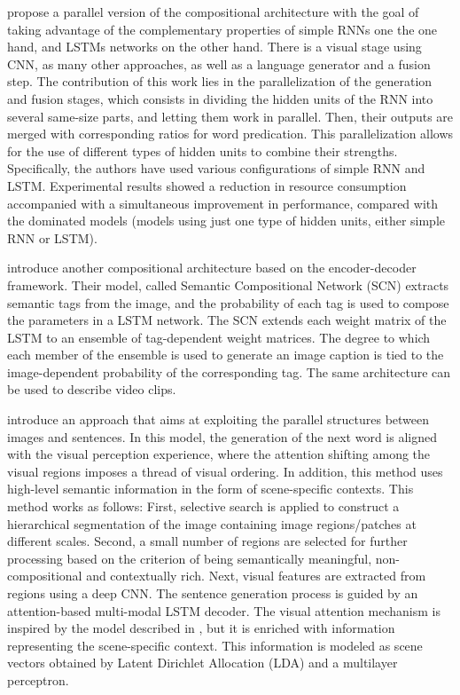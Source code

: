 \citet{Wang2016_Parallel} propose a parallel version of the compositional architecture with the goal of taking advantage of the complementary properties of simple RNNs one the one hand, and LSTMs networks on the other hand. There is a visual stage using CNN, as many other approaches, as well as a language generator and a fusion step. The contribution of this work lies in the parallelization of the generation and fusion stages, which consists in dividing the hidden units of the RNN into several same-size parts, and letting them work in parallel. Then, their outputs are merged with corresponding ratios for word predication. This parallelization allows for the use of different types of hidden units to combine their strengths. Specifically, the authors have used various configurations of simple RNN and LSTM. Experimental results showed a reduction in resource consumption accompanied with a simultaneous improvement in performance, compared with the dominated models (models using just one type of hidden units, either simple RNN or LSTM).

\citet{Gan2017_SCN} introduce another compositional architecture based on the encoder-decoder framework. Their model, called Semantic Compositional Network (SCN) extracts semantic tags from the image, and the probability of each tag is used to compose the parameters in a LSTM network. The SCN extends each weight matrix of the LSTM to an ensemble of tag-dependent weight matrices. The degree to which each member of the ensemble is used to generate an image caption is tied to the image-dependent probability of the corresponding tag. The same architecture can be used to describe video clips.

\citet{Fu2017} introduce an approach that aims at exploiting the parallel structures between images and sentences. In this model, the generation of the next word is aligned with the visual perception experience, where the attention shifting among the visual regions imposes a thread of visual ordering. In addition, this method uses high-level semantic information in the form of scene-specific contexts. This method works as follows: First, selective search \citep{Uijlings2013} is applied to construct a hierarchical segmentation of the image containing image regions/patches at different scales. Second, a small number of regions are selected for further processing based on the criterion of being semantically meaningful, non-compositional and contextually rich. Next, visual features are extracted from regions using a deep CNN. The sentence generation process is guided by an attention-based multi-modal LSTM decoder. The visual attention mechanism is inspired by the model described in \citep{Xu2015}, but it is enriched with information representing the scene-specific context. This information is modeled as scene vectors obtained by Latent Dirichlet Allocation (LDA) \citep{Blei2003} and a multilayer perceptron.

